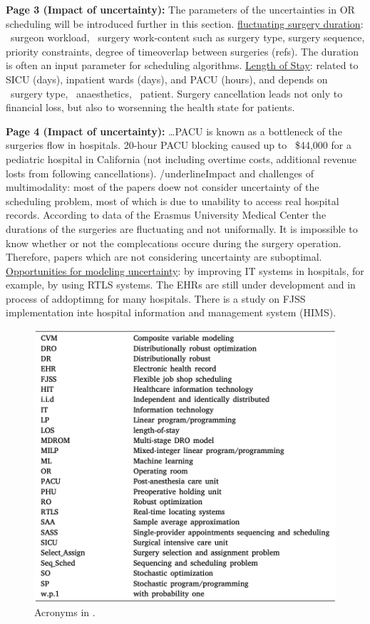     \textbf{Page 3 (Impact of uncertainty):}
    The parameters of the uncertainties in OR scheduling will be introduced further in this section. \underline{fluctuating surgery duration}: ~surgeon workload, ~surgery work-content such as surgery type, surgery sequence, priority constraints, degree of timeoverlap between surgeries (refs). The duration is often an input parameter for scheduling algorithms. \underline{Length of Stay}: related to SICU (days), inpatient wards (days), and PACU (hours), and depends on ~surgery type, ~anaesthetics, ~patient. Surgery cancellation leads not only to financial loss, but also to worsenning the health state for patients.

    \textbf{Page 4 (Impact of uncertainty):}
    \dots PACU is known as a bottleneck of the surgeries flow in hospitals. 20-hour PACU blocking caused up to ~\$44,000 for a pediatric hospital in California (not including overtime costs, additional revenue losts from following cancellations). /underline{Impact and challenges of multimodality}: most of the papers doew not consider uncertainty of the scheduling problem, most of which is due to unability to access real hospital records. According to data of the Erasmus University Medical Center the durations of the surgeries are fluctuating and not uniformally. It is impossible to know whether or not the complecations occure during the surgery operation. Therefore, papers which are not considering uncertainty are suboptimal. \underline{Opportunities for modeling uncertainty}: by improving IT systems in hospitals, for example, by using RTLS systems. The EHRs are still under development and in process of addoptimng for many hospitals. There is a study on FJSS implementation inte hospital information and management system (HIMS).
    \begin{figure}[H]
        \centering
        \includegraphics[width=.9\textwidth]{figures/0015_SR04US22/fig2.png}
        \caption{Acronyms in \cite{x335}.}
        \label{fig2:0015_SR04US22}
    \end{figure}
